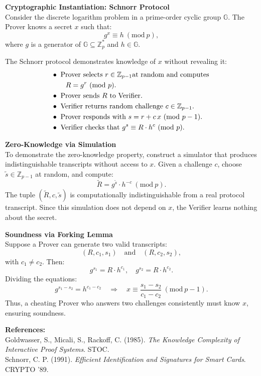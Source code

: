 \begin{technical}
\noindent\textbf{Cryptographic Instantiation: Schnorr Protocol}\\[0.5em]
Consider the discrete logarithm problem in a prime-order cyclic group \( \mathbb{G} \). The Prover knows a secret \( x \) such that:
\[
g^x \equiv h \ (\mathrm{mod}\ p),
\]
where \( g \) is a generator of \( \mathbb{G} \subseteq \mathbb{Z}_p^* \) and \( h \in \mathbb{G} \).

The Schnorr protocol demonstrates knowledge of \( x \) without revealing it:
\begin{align*}
&\bullet\ \text{Prover selects } r \in \mathbb{Z}_{p-1} \text{at random and computes }\\&\text{\hspace{2em}} R = g^r \ (\mathrm{mod}\ p).\\
&\bullet\ \text{Prover sends } R \text{ to Verifier.}\\
&\bullet\ \text{Verifier returns random challenge } c \in \mathbb{Z}_{p-1}.\\
&\bullet\ \text{Prover responds with } s = r + c\,x \ (\mathrm{mod}\ p - 1).\\
&\bullet\ \text{Verifier checks that } g^s \equiv R \cdot h^c \ (\mathrm{mod}\ p).
\end{align*}

\noindent\textbf{Zero-Knowledge via Simulation}\\[0.5em]
To demonstrate the zero-knowledge property, construct a simulator that produces indistinguishable transcripts without access to \( x \). Given a challenge \( c \), choose \( \tilde{s} \in \mathbb{Z}_{p-1} \) at random, and compute:
\[
\tilde{R} = g^{\tilde{s}} \cdot h^{-c} \ (\mathrm{mod}\ p).
\]
The tuple \( (\tilde{R}, c, \tilde{s}) \) is computationally indistinguishable from a real protocol transcript. Since this simulation does not depend on \( x \), the Verifier learns nothing about the secret.

\noindent\textbf{Soundness via Forking Lemma}\\[0.5em]
Suppose a Prover can generate two valid transcripts:
\[
(R, c_1, s_1) \quad \text{and} \quad (R, c_2, s_2),
\]
with \( c_1 \neq c_2 \). Then:
\[
g^{s_1} = R \cdot h^{c_1}, \quad g^{s_2} = R \cdot h^{c_2}.
\]
Dividing the equations:
\[
g^{s_1 - s_2} = h^{c_1 - c_2} \quad \Rightarrow \quad x \equiv \frac{s_1 - s_2}{c_1 - c_2} \ (\mathrm{mod}\ p - 1).
\]
Thus, a cheating Prover who answers two challenges consistently must know \( x \), ensuring soundness.

\vspace{0.5em}
\noindent\textbf{References:}\\
Goldwasser, S., Micali, S., Rackoff, C. (1985). \textit{The Knowledge Complexity of Interactive Proof Systems}. STOC.\\
Schnorr, C. P. (1991). \textit{Efficient Identification and Signatures for Smart Cards}. CRYPTO '89.
\end{technical}
